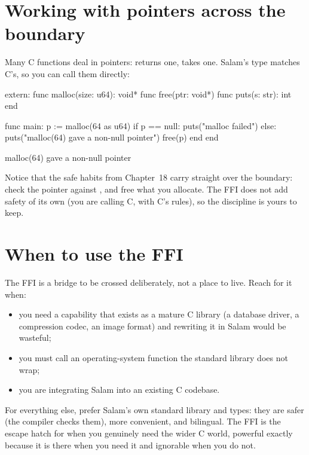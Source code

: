 \section{Working with pointers across the boundary}

Many C functions deal in pointers:  returns one,  takes
one. Salam's  type matches C's, so you can call them directly:

\begin{salamen}
extern:
    func malloc(size: u64): void*
    func free(ptr: void*)
    func puts(s: str): int
end

func main:
    p := malloc(64 as u64)
    if p == null:
        puts("malloc failed")
    else:
        puts("malloc(64) gave a non-null pointer")
        free(p)
    end
end
\end{salamen}

\begin{progout}
malloc(64) gave a non-null pointer
\end{progout}

Notice that the safe habits from Chapter~18 carry straight over the boundary:
check the pointer against , and free what you allocate. The FFI does not
add safety of its own (you are calling C, with C's rules), so the discipline is
yours to keep.

\section{When to use the FFI}

The FFI is a bridge to be crossed deliberately, not a place to live. Reach for it
when:

\begin{itemize}[leftmargin=1.4em]
  \item you need a capability that exists as a mature C library (a database
        driver, a compression codec, an image format) and rewriting it in Salam
        would be wasteful;
  \item you must call an operating-system function the standard library does not
        wrap;
  \item you are integrating Salam into an existing C codebase.
\end{itemize}

For everything else, prefer Salam's own standard library and types: they are safer
(the compiler checks them), more convenient, and bilingual. The FFI is the escape
hatch for when you genuinely need the wider C world, powerful exactly because it
is there when you need it and ignorable when you do not.

